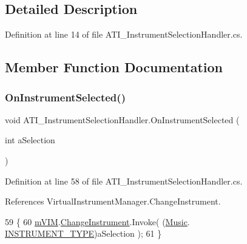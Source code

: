 \subsection{Detailed Description}


Definition at line 14 of file A\+T\+I\+\_\+\+Instrument\+Selection\+Handler.\+cs.



\subsection{Member Function Documentation}
\mbox{\label{class_a_t_i___instrument_selection_handler_af9ac3dae1f7938a64d9ecdee529ee677}} 
\subsubsection{\texorpdfstring{On\+Instrument\+Selected()}{OnInstrumentSelected()}}
{\footnotesize\ttfamily void A\+T\+I\+\_\+\+Instrument\+Selection\+Handler.\+On\+Instrument\+Selected (\begin{DoxyParamCaption}\item[{int}]{a\+Selection }\end{DoxyParamCaption})}



Definition at line 58 of file A\+T\+I\+\_\+\+Instrument\+Selection\+Handler.\+cs.



References Virtual\+Instrument\+Manager.\+Change\+Instrument.


\begin{DoxyCode}
59     \{
60         \hyperlink{class_a_t_i___instrument_selection_handler_a744213ecae613372020009bc5c9688c8}{mVIM}.\hyperlink{group___v_i_m_events_ga1b9f12a73a5418ea5695d38b78c506c4}{ChangeInstrument}.Invoke( (\hyperlink{class_music}{Music}.
      \hyperlink{group___music_enums_gabfce60192305965558a36e368ebd67c3}{INSTRUMENT\_TYPE})aSelection );
61     \}
\end{DoxyCode}
\mbox{\label{class_a_t_i___instrument_selection_handler_a5c6b182a8c8be5d409a2b17e6d8f67a2}} 
